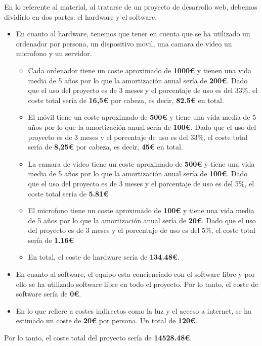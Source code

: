 \documentclass{report}
\begin{document}
{            En lo referente al material, al tratarse de un proyecto de desarrollo web, debemos dividirlo en dos partes: el hardware y el software.\\
            \begin{itemize}
                \item En cuanto al hardware, tenemos que tener en cuenta que se ha utilizado un ordenador por persona, un dispositivo movil, una camara de video un microfono y un servidor.
                \begin{itemize}
                    \item Cada ordenador tiene un coste aproximado de \textbf{1000€} y tienen una vida media de 5 años por lo que la amortización anual sería de \textbf{200€}. Dado que el uso del proyecto es de 3 meses y el porcentaje de uso es del 33\%, el coste total sería de \textbf{16,5€} por cabeza, es decir, \textbf{82.5€} en total.
                    \item El móvil tiene un coste aproximado de \textbf{500€} y tiene una vida media de 5 años por lo que la amortización anual sería de \textbf{100€}. Dado que el uso del proyecto es de 3 meses y el porcentaje de uso es del 33\%, el coste total sería de \textbf{8,25€} por cabeza, es decir, \textbf{45€} en total.
                    \item La camara de video tiene un coste aproximado de \textbf{500€} y tiene una vida media de 5 años por lo que la amortización anual sería de \textbf{100€}. Dado que el uso del proyecto es de 3 meses y el porcentaje de uso es del 5\%, el coste total sería de \textbf{5.81€}
                    \item El microfono tiene un coste aproximado de \textbf{100€} y tiene una vida media de 5 años por lo que la amortización anual sería de \textbf{20€}. Dado que el uso del proyecto es de 3 meses y el porcentaje de uso es del 5\%, el coste total sería de \textbf{1.16€}
                    \item En total, el coste de hardware sería de \textbf{134.48€}.
                \end{itemize}
                \item En cuanto al software, el equipo esta concienciado con el software libre y por ello se ha utilizado software libre en todo el proyecto. Por lo tanto, el coste de software sería de \textbf{0€}.
                \item En lo que refiere a costes indirectos como la luz y el acceso a internet, se ha estimado un coste de \textbf{20€} por persona. Un total de \textbf{120€}.
            \end{itemize}
            Por lo tanto, el coste total del proyecto sería de \textbf{14528.48€}.
        }
\end{document}
